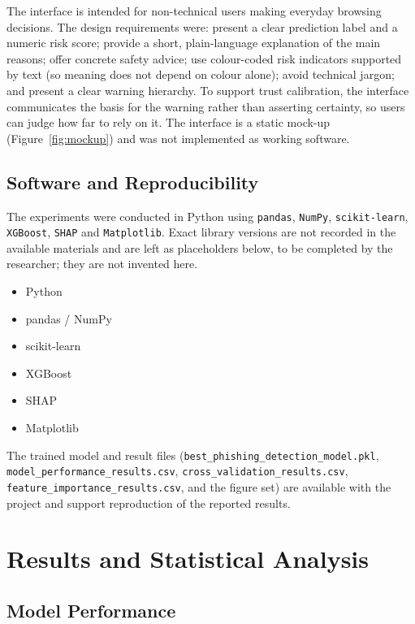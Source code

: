 \documentclass[11pt,a4paper]{article}
\begin{document}
The interface is intended for non-technical users making everyday browsing decisions. The
design requirements were: present a clear prediction label and a numeric risk score; provide a
short, plain-language explanation of the main reasons; offer concrete safety advice; use
colour-coded risk indicators supported by text (so meaning does not depend on colour alone);
avoid technical jargon; and present a clear warning hierarchy. To support trust calibration,
the interface communicates the basis for the warning rather than asserting certainty, so users
can judge how far to rely on it. The interface is a static mock-up (Figure~\ref{fig:mockup})
and was not implemented as working software.

\subsection{Software and Reproducibility}

The experiments were conducted in Python using \texttt{pandas}, \texttt{NumPy},
\texttt{scikit-learn}, \texttt{XGBoost}, \texttt{SHAP} and \texttt{Matplotlib}. Exact library
versions are not recorded in the available materials and are left as placeholders below, to be
completed by the researcher; they are not invented here.

\begin{itemize}[noitemsep,topsep=2pt]
\item Python
\item pandas / NumPy
\item scikit-learn
\item XGBoost
\item SHAP
\item Matplotlib
\end{itemize}

The trained model and result files (\texttt{best\_phishing\_detection\_model.pkl},
\texttt{model\_performance\_results.csv}, \texttt{cross\_validation\_results.csv},
\texttt{feature\_importance\_results.csv}, and the figure set) are available with the project
and support reproduction of the reported results.

\section{Results and Statistical Analysis}

\subsection{Model Performance}
\end{document}

